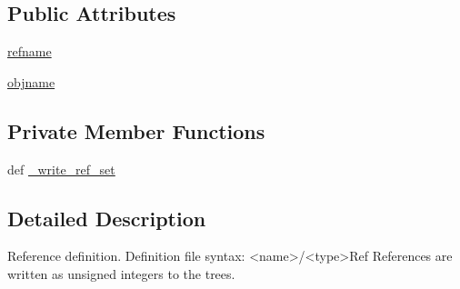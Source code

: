 \subsection*{Public Attributes}
\begin{DoxyCompactItemize}
\item 
\hyperlink{classpanda_1_1refbranch_1_1RefBranch_ab5947bb68e44780574d418de9ce28078}{refname}
\item 
\hyperlink{classpanda_1_1refbranch_1_1RefBranch_ad27bf0f3a3221d8e15ca9def9ec4aeb3}{objname}
\end{DoxyCompactItemize}
\subsection*{Private Member Functions}
\begin{DoxyCompactItemize}
\item 
def \hyperlink{classpanda_1_1refbranch_1_1RefBranch_abe764bb844fed25edac13fa9fa4b27f5}{\_\-write\_\-ref\_\-set}
\end{DoxyCompactItemize}


\subsection{Detailed Description}
\begin{DoxyVerb}
Reference definition. Definition file syntax:
<name>/<type>Ref
References are written as unsigned integers to the trees.
\end{DoxyVerb}
 

